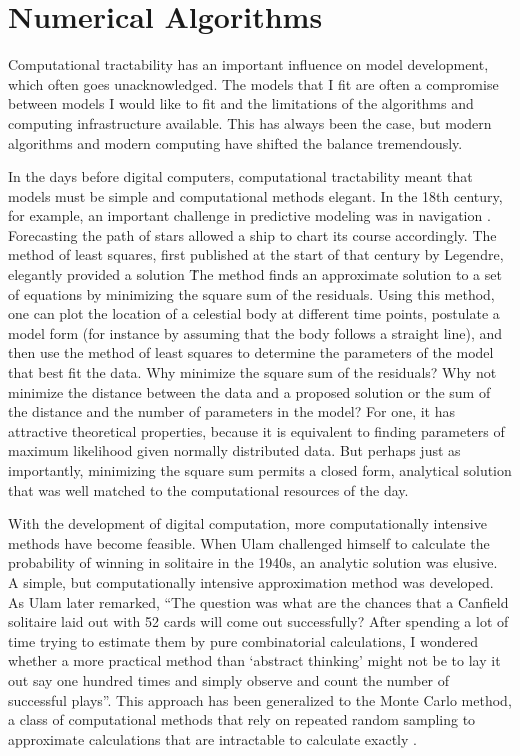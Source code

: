 \chapter{Numerical Algorithms}
\label{numerical-algorithms}

Computational tractability has an important influence on model
development, which often goes unacknowledged. The models that I fit
are often a compromise between models I would like to fit and the
limitations of the algorithms and computing infrastructure
available. This has always been the case, but modern algorithms and
modern computing have shifted the balance tremendously.

In the days before digital computers, computational tractability meant
that models must be simple and computational methods elegant. In the
18th century, for example, an important challenge in predictive
modeling was in navigation \cite{Williams_From_1993}. Forecasting the
path of stars allowed a ship to chart its course accordingly. The
method of least squares, first published at the start of that century
by Legendre, elegantly provided a solution
\cite{Legendre_Nouvelles_2011}\. The method finds an approximate
solution to a set of equations by minimizing the square sum of the
residuals. Using this method, one can plot the location of a celestial
body at different time points, postulate a model form (for instance by
assuming that the body follows a straight line), and then use the
method of least squares to determine the parameters of the model that
best fit the data. Why minimize the square sum of the residuals? Why
not minimize the distance between the data and a proposed solution or
the sum of the distance and the number of parameters in the model? For
one, it has attractive theoretical properties, because it is
equivalent to finding parameters of maximum likelihood given normally
distributed data. But perhaps just as importantly, minimizing the
square sum permits a closed form, analytical solution that was well
matched to the computational resources of the day.

With the development of digital computation, more computationally
intensive methods have become feasible. When Ulam challenged himself
to calculate the probability of winning in solitaire in the 1940s, an
analytic solution was elusive. A simple, but computationally intensive
approximation method was developed. As Ulam later remarked, ``The
question was what are the chances that a Canfield solitaire laid out
with 52 cards will come out successfully? After spending a lot of time
trying to estimate them by pure combinatorial calculations, I wondered
whether a more practical method than `abstract thinking' might not
be to lay it out say one hundred times and simply observe and count
the number of successful plays''. This approach has been
generalized to the Monte Carlo method, a class of computational
methods that rely on repeated random sampling to approximate
calculations that are intractable to calculate exactly
\cite{Eckhardt_Stan_1987}.

